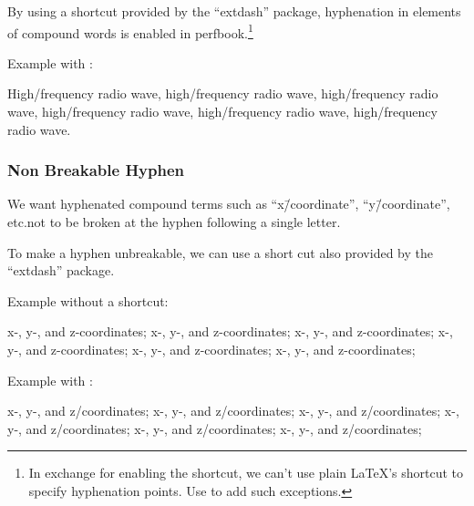 By using a shortcut \qco{\\-/} provided by the
``extdash'' package, hyphenation in elements of compound
words is enabled in perfbook.\footnote{
  In exchange for enabling the shortcut, we can't use plain
  \LaTeX's shortcut \qco{\\-} to specify hyphenation points.
  Use  to add such exceptions.
}

Example with \qco{\\-/}:

\begin{center}\begin{minipage}{2.6in}\vspace{0.6\baselineskip}
  High\-/frequency radio wave, high\-/frequency radio wave,
  high\-/frequency radio wave, high\-/frequency radio wave,
  high\-/frequency radio wave, high\-/frequency radio wave.
\vspace{0.6\baselineskip}\end{minipage}\end{center}

\subsubsection{Non Breakable Hyphen}
\label{sec:app:styleguide:Non Breakable Hyphen}

We want hyphenated compound terms such as ``x\=/coordinate'',
``y\=/coordinate'', etc.\@ not to be broken at the hyphen
following a single letter.

To make a hyphen unbreakable, we can use a short cut
\qco{\\=/} also provided by the ``extdash'' package.

Example without a shortcut:

\begin{center}\begin{minipage}{2.55in}\vspace{0.6\baselineskip}
x-, y-, and z-coordinates; x-, y-, and z-coordinates;
x-, y-, and z-coordinates; x-, y-, and z-coordinates;
x-, y-, and z-coordinates; x-, y-, and z-coordinates;
\vspace{0.6\baselineskip}\end{minipage}\end{center}

Example with \qco{\\-/}:

\begin{center}\begin{minipage}{2.55in}\vspace{0.6\baselineskip}
x-, y-, and z\-/coordinates; x-, y-, and z\-/coordinates;
x-, y-, and z\-/coordinates; x-, y-, and z\-/coordinates;
x-, y-, and z\-/coordinates; x-, y-, and z\-/coordinates;
\vspace{0.6\baselineskip}\end{minipage}\end{center}


